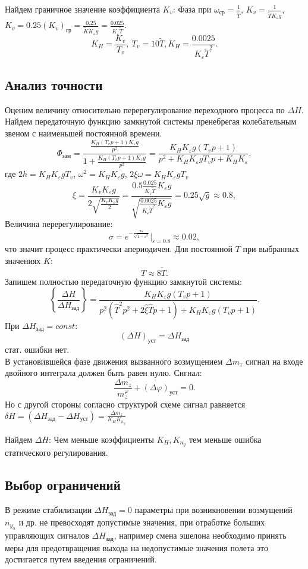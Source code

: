 \documentclass{article}
\begin{document}
Найдем граничное значение коэффициента $K_v$:
Фаза при $\omega_\text{ср} = \frac{1}{\tilde{T}} $, $K_v = \frac{1}{\tilde{T}
		K_\varepsilon g}$, $K_v = 0.25 (K_v)_\text{гр} = \frac{0.25}{\tilde{K}
		K_\varepsilon g} = \frac{0.025}{K_\varepsilon \tilde{T}}$.
\[
	K_H = \frac{K_v}{T_v}, \ T_v = 10 \tilde{T}, K_H =
	\frac{0.0025}{K_\varepsilon \tilde{T}^2}
	.\]

\subsection{Анализ точности}
Оценим величину относительно перерегулирование переходного процесса по $\Delta
	H$. Найдем передаточную функцию замкнутой системы пренебрегая колебательным
звеном с наименьшей постоянной времени.
\[
	\Phi_\text{зам} = \frac{\frac{K_H(T_v p + 1) K_\varepsilon g}{p^2}}{1 +
		\frac{K_H(T_v p + 1) K_\varepsilon g}{p^2}} = \frac{K_H K_\varepsilon g(T_v
		p + 1)}{ p^2 +  K_H K_\varepsilon g T_v p +  K_H K_\varepsilon}
	,\]
где $2h = K_H K_\varepsilon g T_v$, $\omega^2 = K_H K_\varepsilon g$, $2 \xi
	\omega = K_H K_\varepsilon g T_v$
\[
	\xi = \frac{K_v K_\varepsilon g}{2 \sqrt{\frac{K_v K_\varepsilon g}{2}}} =
	\frac{0.5 \frac{0.025}{K_\varepsilon \tilde{T}} K_\varepsilon
		g}{\sqrt{\frac{0.0025}{K_\varepsilon \tilde{T}^2} K_\varepsilon  g}} = 0.25
	\sqrt{g} \approx 0.8,
\]
Величина перерегулирование:
\[
	\sigma = e^{- \frac{\pi \varepsilon}{\sqrt{1 - \varepsilon^2}}}
	|_{\varepsilon = 0.8} \approx 0.02,
\]
что значит процесс практически апериодичен. Для постоянной $T$ при выбранных
значениях $K$:
\[
	T \approx 8 \tilde{T}
	.\]
Запишем полностью передаточную функцию замкнутой системы:
\[
	\left\{ \frac{\Delta H }{\Delta H_\text{зад}} \right\}  = \frac{K_H
		K_\varepsilon g (T_v p + 1)}{p^2 (\hat{T}^2 p^2 + 2 \hat{\xi} \hat{T}p + 1)
		+ K_H K_\varepsilon g (T_v p +1)}.
\]
При $\Delta H_\text{зад} = const$:
\[
	(\Delta H)_\text{уст} = \Delta H_\text{зад}
\]
стат. ошибки нет.\\
В установившейся фазе движения вызванного возмущением $ \Delta m_z $ сигнал на
входе двойного интеграла должен быть равен нулю.
Сигнал:
\[
	\frac{\Delta m_z}{m_z^\varphi} + (\Delta \varphi)_\text{уст} = 0
	.\]
Но с другой стороны согласно структурой схеме сигнал равняется $\delta H =
	(\Delta H_\text{зад} - \Delta H_\text{уст}) = \frac{\Delta m_z}{K_H K_{n_y}}$

Найдем $\Delta H$:
Чем меньше коэффициенты $K_H, K_{n_y}$ тем меньше ошибка статического
регулирования.

\subsection{Выбор ограничений}
В режиме стабилизации $\Delta H_\text{зад} = 0$ параметры при возникновении
возмущений $n_{y_\alpha}$ и др. не превосходят допустимые значения, при
отработке больших управляющих сигналов $\Delta H_\text{зад}$, например смена
эшелона необходимо принять меры для предотвращения выхода на недопустимые
значения полета это достигается путем введения ограничений.
\end{document}
